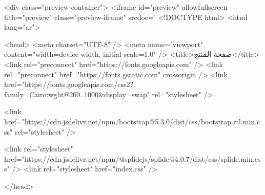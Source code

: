 <div class="preview-container">
<iframe id="preview" allowfullscreen title="preview" class="preview-iframe" srcdoc='
<!DOCTYPE html>
<html lang="ar">

  <head>
    <meta charset="UTF-8" />
    <meta name="viewport" content="width=device-width, initial-scale=1.0" />
    <title>صفحة المنتج</title>
    <link rel="preconnect" href="https://fonts.googleapis.com" />
    <link rel="preconnect" href="https://fonts.gstatic.com" crossorigin />
    <link href="https://fonts.googleapis.com/css2?family=Cairo:wght@200..1000&display=swap" rel="stylesheet" />
   
    <link href="https://cdn.jsdelivr.net/npm/bootstrap@5.3.0/dist/css/bootstrap.rtl.min.css" rel="stylesheet" />
     
    <link rel="stylesheet" href="https://cdn.jsdelivr.net/npm/@splidejs/splide@4.0.7/dist/css/splide.min.css" />
    <link rel="stylesheet" href="index.css" />

    
  </head>

